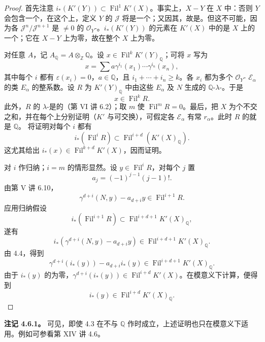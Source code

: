 \begin{proof}
首先注意 $i_*(K'(Y))\subset\operatorname{Fil}^1K'(X)$。事实上，$X-Y$ 在 $X$ 中：否则 $Y$ 会包含一个，在这个上，定义 $Y$ 的 $\mathcal J$ 将是一个；又因其，故是。但这不可能，因为各 $\mathcal J^n/\mathcal J^{n+1}$ 是 $\ne0$ 的 $\mathcal O_Y$-。$i_*(K'(Y))$ 的元素在 $K'(X)$ 中的是 $X$ 上的一个；它在 $X-Y$ 上为零，故在整个 $X$ 上为零。

对任意 $A$，记 $A_{\mathbb Q}=A\otimes_{\mathbb Z}\mathbb Q$。设 $x\in\operatorname{Fil}^kK'(Y)_{\mathbb Q}$；可将 $x$ 写为
\[
x=\sum a\gamma^{i_1}(x_1)\cdots\gamma^{i_n}(x_n),
\]
其中每个 $i$ 都有 $\varepsilon(x_i)=0$，$a\in\mathbb Q$，且 $i_1+\cdots+i_n\geq k$。各 $x_i$ 都为多个 $\mathcal O_Y$- $\mathcal E_\alpha$ 的类 $E_\alpha$ 的整系数。设 $R$ 为 $K'(Y)_{\mathbb Q}$ 中由这些 $E_\alpha$ 及 $N$ 生成的 $\mathbb Q$-$\lambda$-。于是
\[
x\in\operatorname{Fil}^kR.
\]
此外，$R$ 的 $\lambda$-是的（第 VI 讲 6.2）；取 $m$ 使 $\operatorname{Fil}^mR=0$。最后，把 $X$ 为个不交之和，并在每个上分别证明（$K'$ 与可交换），可假定各 $\mathcal E_\alpha$ 有常 $r_\alpha$。此时 $R$ 的就是 $\mathbb Q$。
将证明对每个 $i$ 都有
\[
i_*(\operatorname{Fil}^iR)\subset\operatorname{Fil}^{i+d}(K'(X)_{\mathbb Q}).
\]
这尤其给出 $i_*(x)\in\operatorname{Fil}^{k+d}K'(X)$，因而证明。

对 $i$ 作归纳；$i=m$ 的情形显然。设 $y\in\operatorname{Fil}^iR$，对每个 $j$ 置
\[
a_j=(-1)^{j-1}(j-1)!.
\]
由第 V 讲 6.10，
\[
\gamma^{d+i}(N,y)-a_{d+i}y\in\operatorname{Fil}^{i+1}R.
\]
应用归纳假设
\[
i_*(\operatorname{Fil}^{i+1}R)\subset\operatorname{Fil}^{i+d+1}K'(X)_{\mathbb Q},
\]
遂有
\[
i_*(\gamma^{d+i}(N,y)-a_{d+i}y)\in\operatorname{Fil}^{i+d+1}K'(X)_{\mathbb Q}.
\]
由 4.4，得到
\[
\gamma^{d+i}(i_*(y))-a_{d+i}i_*(y)\in\operatorname{Fil}^{i+d+1}K'(X)_{\mathbb Q}.
\]
由于 $i_*(y)$ 的为零，$\gamma^{d+i}(i_*(y))\in\operatorname{Fil}^{i+d}K'(X)$。在模意义下计算，便得到
\[
i_*(y)\in\operatorname{Fil}^{i+d}K'(X)_{\mathbb Q}.
\]
\end{proof}
\textbf{注记 4.6.1。} 可见，即使 4.3 在不与 $\mathbb Q$ 作时成立，上述证明也只在模意义下适用。例如可参看第 XIV 讲 4.6。

